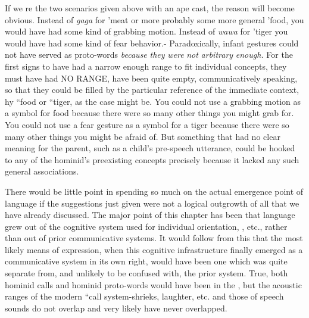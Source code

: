 If we re the two scenarios given above with an ape cast, the reason will become obvious. Instead of \textit{gaga} for 'meat or more prob\-ably some more general 'food, you would have had some kind of grabbing motion. Instead of \textit{wawa} for 'tiger you would have had some kind of fear behavior.- Paradoxically, infant gestures could not have served as proto-words \textit{because} \textit{they} \textit{were} \textit{not} \textit{arbitrary} \textit{enough.} For the first signs to have had a narrow enough range to fit individual concepts, they must have had NO RANGE, have been quite empty, communi\-catively speaking, so that they could be filled by the particular refer\-ence of the immediate context, hy ``food or ``tiger, as the case might be. You could not use a grabbing motion as a symbol for food because there were so many other things you might grab for. You could not use a fear gesture as a symbol for a tiger because there were so many other things you might be afraid of. But something that had no clear meaning for the parent, such as a child's pre-speech utterance, could be hooked to any of the hominid's preexisting concepts precisely because it lacked any such general associations.

There would be little point in spending so much  on the actual emergence point of language if the suggestions just given were not a logical outgrowth of all that we have already discussed. The major point of this chapter has been that language grew out of the cognitive system used for individual orientation, , etc., rather than out of prior communicative systems. It would follow from this that the most likely means of expression, when this cognitive infra\-structure finally emerged as a communicative system in its own right, would have been one which was quite separate from, and unlikely to be confused with, the prior system. True, both hominid calls and hominid proto-words would have been in the , but the acoustic ranges of the modern ``call system{\textquotedbl}-shrieks, laughter, etc.\-
and those of speech sounds do not overlap and very likely have never overlapped.

